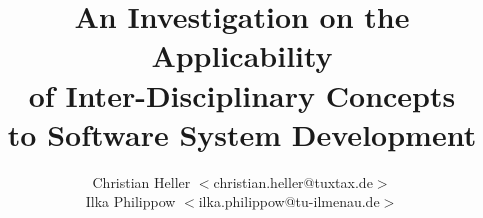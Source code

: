 %
%
%
%
%
%
%

\title{An Investigation on the Applicability\\
of Inter-Disciplinary Concepts\\
to Software System Development}
\author{%
    Christian Heller \(<\)christian.heller@tuxtax.de\(>\)\\
    Ilka Philippow \(<\)ilka.philippow@tu-ilmenau.de\(>\)\\
}
